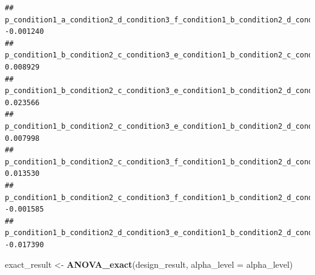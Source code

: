 \documentclass[]{book}
\newenvironment{Shaded}{\begin{snugshade}}{\end{snugshade}}
\newcommand{\DataTypeTok}[1]{\textcolor[rgb]{0.13,0.29,0.53}{#1}}
\newcommand{\KeywordTok}[1]{\textcolor[rgb]{0.13,0.29,0.53}{\textbf{#1}}}
\newcommand{\NormalTok}[1]{#1}
\newcommand{\StringTok}[1]{\textcolor[rgb]{0.31,0.60,0.02}{#1}}
\begin{document}
\begin{verbatim}
## p_condition1_a_condition2_d_condition3_f_condition1_b_condition2_d_condition3_f   -0.001240
## p_condition1_b_condition2_c_condition3_e_condition1_b_condition2_c_condition3_f    0.008929
## p_condition1_b_condition2_c_condition3_e_condition1_b_condition2_d_condition3_e    0.023566
## p_condition1_b_condition2_c_condition3_e_condition1_b_condition2_d_condition3_f    0.007998
## p_condition1_b_condition2_c_condition3_f_condition1_b_condition2_d_condition3_e    0.013530
## p_condition1_b_condition2_c_condition3_f_condition1_b_condition2_d_condition3_f   -0.001585
## p_condition1_b_condition2_d_condition3_e_condition1_b_condition2_d_condition3_f   -0.017390
\end{verbatim}

\begin{Shaded}
\begin{Highlighting}[]
\NormalTok{exact_result <-}\StringTok{ }\KeywordTok{ANOVA_exact}\NormalTok{(design_result, }\DataTypeTok{alpha_level =}\NormalTok{ alpha_level)}
\end{Highlighting}
\end{Shaded}
\end{document}
